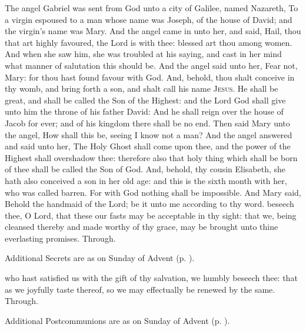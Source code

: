  The angel Gabriel was sent from God unto a city of Galilee, named Nazareth, To a virgin espoused to a man whose name was Joseph, of the house of David; and the virgin's name was Mary. And the angel came in unto her, and said, Hail, thou that art highly favoured, the Lord is with thee: blessed art thou among women. And when she saw him, she was troubled at his saying, and cast in her mind what manner of salutation this should be. And the angel said unto her, Fear not, Mary: for thou hast found favour with God. And, behold, thou shalt conceive in thy womb, and bring forth a son, and shalt call his name \textsc{Jesus}. He shall be great, and shall be called the Son of the Highest: and the Lord God shall give unto him the throne of his father David: And he shall reign over the house of Jacob for ever; and of his kingdom there shall be no end. Then said Mary unto the angel, How shall this be, seeing I know not a man? And the angel answered and said unto her, The Holy Ghost shall come upon thee, and the power of the Highest shall overshadow thee: therefore also that holy thing which shall be born of thee shall be called the Son of God. And, behold, thy cousin Elisabeth, she hath also conceived a son in her old age: and this is the sixth month with her, who was called barren. For with God nothing shall be impossible. And Mary said, Behold the handmaid of the Lord; be it unto me according to thy word.
\secret
{} beseech thee, O Lord, that these our fasts may be acceptable in thy sight: that we, being cleansed thereby and made worthy of thy grace, may be brought unto thine everlasting promises. Through.
\begin{rubric}
    Additional Secrets are as on  Sunday of Advent (p. \pageref{AdventI}).
\end{rubric}
\postcommunion
{} who hast satisfied us with the gift of thy salvation, we humbly beseech thee: that as we joyfully taste thereof, so we may effectually be renewed by the same. Through.
\begin{rubric}
    Additional Postcommunions are as on  Sunday of Advent (p. \pageref{AdventI}).
\end{rubric}

